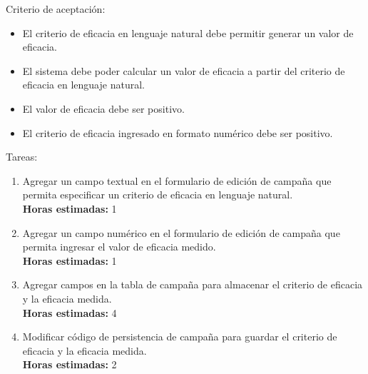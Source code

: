 \documentclass[a4paper, 10pt, twoside]{article}
\newenvironment{stories}{
  \begin{itemize}
}{
  \end{itemize}
}
\newenvironment{tasks}{
  Tareas:
  \begin{enumerate}
}{
  \end{enumerate}
}
\newcommand{\task}[1] {
  \item #1.\\
  \textbf{Horas estimadas:}
}
\newenvironment{criterios}{
  Criterio de aceptación:
  \begin{itemize}
}{
  \end{itemize}
}
\newcommand{\criteria}[1] {
  \item #1
}
\begin{document}
\begin{stories}
   \begin{criterios}
  	\criteria{El criterio de eficacia en lenguaje natural debe permitir generar un valor de eficacia.}
    \criteria{El sistema debe poder calcular un valor de eficacia a partir del criterio de eficacia en lenguaje natural.}
    \criteria{El valor de eficacia debe ser positivo.}
    \criteria{El criterio de eficacia ingresado en formato numérico debe ser positivo.}
  \end{criterios} 

  \begin{tasks}
    \task{Agregar un campo textual en el formulario de edición de campaña que permita especificar un criterio de eficacia en lenguaje natural} 1
    \task{Agregar un campo numérico en el formulario de edición de campaña que permita ingresar el valor de eficacia medido} 1
    \task{Agregar campos en la tabla de campaña para almacenar el criterio de eficacia y la eficacia medida} 4
    \task{Modificar código de persistencia de campaña para guardar el criterio de eficacia y la eficacia medida} 2
  \end{tasks}
\end{stories}
\end{document}
